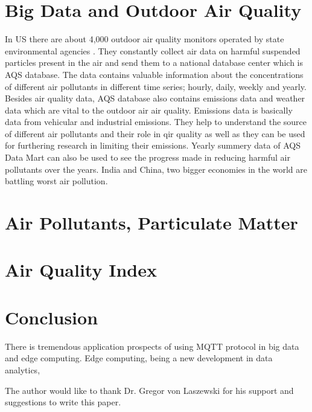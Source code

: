 \documentclass[sigconf]{acmart}
\begin{document}
   
 



\section{Big Data and Outdoor Air Quality}
In US there are about 4,000 outdoor air quality monitors operated by state environmental agencies \cite{outdoor-air}. They constantly collect air data on harmful suspended particles present in the air and send them to a national database center which is
AQS database. The data contains valuable information about the concentrations of different air pollutants in different time series; hourly, daily, weekly and yearly. Besides air quality data, AQS database also contains emissions data and weather data which are vital to the outdoor air air quality. Emissions data is basically data from vehicular and industrial emissions. They help to  understand the source of different air pollutants and their role in qir quality as well as they can be used for furthering research in limiting their emissions. Yearly summery data of AQS Data Mart can also be used to see the progress made in reducing harmful air pollutants over the years.
India and China, two bigger economies in the world are battling worst air pollution. 


\section{Air Pollutants, Particulate Matter}




\section{Air Quality Index}











\section{Conclusion}
There is tremendous application prospects of using MQTT protocol in big data and edge computing. Edge computing, being a new  development in data analytics,   


\begin{acks}

  The author would like to thank Dr. Gregor von Laszewski for his
  support and suggestions to write this paper.

\end{acks}


 
\end{document}
